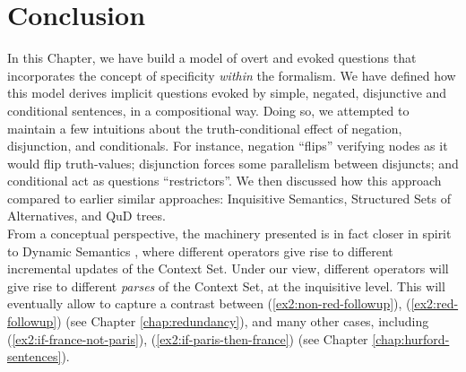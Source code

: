 \section{Conclusion}
In this Chapter, we have build a model of overt and evoked questions that incorporates the concept of specificity \textit{within} the formalism. We have defined how this model derives implicit questions evoked by simple, negated, disjunctive and conditional sentences, in a compositional way. Doing so, we attempted to maintain a few intuitions about the truth-conditional effect of negation, disjunction, and conditionals. For instance, negation ``flips'' verifying nodes as it would flip truth-values; disjunction forces some parallelism between disjuncts; and conditional act as questions ``restrictors''. We then discussed how this approach compared to earlier similar approaches: Inquisitive Semantics, Structured Sets of Alternatives, and QuD trees.\\

From a conceptual perspective, the machinery presented is in fact closer in spirit to Dynamic Semantics \parencite{Heim1983a,Heim1983b}, where different operators give rise to different incremental updates of the Context Set. Under our view, different operators will give rise to different \textit{parses} of the Context Set, at the inquisitive level. This will eventually allow to capture a contrast between (\ref{ex2:non-red-followup}), (\ref{ex2:red-followup}) (see Chapter \ref{chap:redundancy}), and many other cases, including (\ref{ex2:if-france-not-paris}), (\ref{ex2:if-paris-then-france}) (see Chapter \ref{chap:hurford-sentences}).





